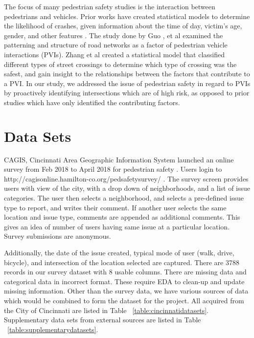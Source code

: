 \documentclass{llncs}
\begin{document}
The focus of many pedestrian safety studies is the interaction between pedestrians and vehicles. Prior works have created statistical models to determine the likelihood of crashes, given information about the time of day, victim's age, gender, and other features \cite{brude1993models} \cite{lascala2000demographic} \cite{lyon2002pedestrian} \cite{ladron2004forecasting} \cite{pulugurtha2011pedestrian} \cite{ukkusuri2011random}. The study done by Guo \cite{guo2017effect}, et al examined the patterning and structure of road networks as a factor of pedestrian vehicle interactions (PVIs). Zhang et al \cite{zhang2017quantitative} created a statistical model that classified different types of street crossings to determine which type of crossing was the safest, and gain insight to the relationships between the factors that contribute to a PVI. In our study, we addressed the issue of pedestrian safety in regard to PVIs by proactively identifying intersections which are of high risk, as opposed to prior studies which have only identified the contributing factors.


\section{Data Sets}
%
%
CAGIS, Cincinnati Area Geographic Information System launched an online survey from Feb 2018 to April 2018 for pedestrian safety \cite{cvg2018city}. Users login to http://cagisonline.hamilton-co.org/pedsafetysurvey/ . The survey screen provides users with view of the city, with a drop down of neighborhoods, and a list of issue categories. The user then selects a neighborhood, and selects a pre-defined issue type to report, and writes their comment. If another user selects the same location and issue type, comments are appended as additional comments. This gives an idea of number of users having same issue at a particular location. Survey submissions are anonymous.

Additionally, the date of the issue created, typical mode of user (walk, drive, bicycle), and intersection of the location selected are captured. There are 3788 records in our survey dataset with 8 usable columns. There are missing data and categorical data in incorrect format. These require EDA to clean-up and update missing information. Other than the survey data, we have various sources of data which would be combined to form the dataset for the project. All acquired from the City of Cincinnati are listed in Table ~\ref{table:cincinnatidatasets}. Supplementary data sets from external sources are listed in Table ~\ref{table:supplementarydatasets}.
\end{document}
